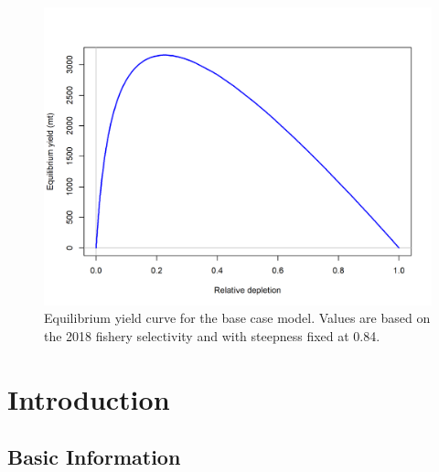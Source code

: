 \documentclass[12pt,]{article}
\begin{document}
\begin{figure}
\centering
\includegraphics{r4ss/plots_mod1/yield1_yield_curve.png}
\caption{Equilibrium yield curve for the base case model. Values are
based on the 2018 fishery selectivity and with steepness fixed at 0.84.
\label{fig:Yield_all}}
\end{figure}

\FloatBarrier

\newpage

\renewcommand{\thefigure}{\arabic{figure}}
\renewcommand{\thetable}{\arabic{table}}

\setcounter{figure}{0} \setcounter{table}{0}


\section{Introduction}\label{introduction}

\subsection{Basic Information}\label{basic-information}
\end{document}
